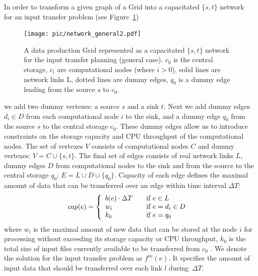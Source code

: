 \documentclass{svjour3}                     %
\begin{document}
In order to transform a given graph of a Grid into a capacitated $\{s,t\}$
network for an input transfer problem (see Figure~\ref{network_general})
%
\begin{figure}[b]
	\begin{center}
		\texttt{[image: pic/network\_general2.pdf]}
	\end{center}
	\caption{A data production Grid represented as a capacitated $\{s,t\}$ network for the input transfer planning (general case). $c_{0}$ is the central storage, $c_{i}$ are computational nodes (where $i>0$), solid lines are network links L, dotted lines are dummy edges, $q_{0}$ is a dummy edge leading from the source $s$ to $c_{0}$. }
	\label{network_general}
\end{figure}  
%
 we add two dummy vertexes: a source $s$
and a sink $t$. Next we add  dummy edges $d_{i} \in D$ from each computational
node $i$ to the sink, and a dummy edge $q_{0}$ from the source $s$ to the
central storage $c_{0}$. These dummy edges allow us to introduce constraints
on the storage capacity and CPU throughput of the computational nodes. The set of vertexes $V$ consists of
computational nodes $C$ and dummy vertexes: $V= C \cup \{s,t\}$. The final set
of edges consists of real network links $L$, dummy edges $D$ from
computational nodes to the sink and from the source to the central storage
$q_{0}$: $E= L \cup D \cup \{q_{0}\}$. Capacity of each edge defines the
maximal amount of data that can be transferred over an edge within time
interval $\Delta T$: 
%
\begin{equation} 
\label{edge_cap} 
cap(e) = \left\{
\begin{array}{l l} 
b(e) \cdot \Delta T & \quad \text{if }e \in L \\
 w_{i} & \quad \text{if } e = d_{i} \in D \\
  k_{0} & \quad \text{if } e = q_{0} 
\end{array} \right.
\end{equation} 
%
where $w_{i}$ is the maximal amount of new data that can be
stored at the node $i$ for processing without exceeding its storage capacity or CPU throughput, $k_{0}$ is the total size of input files currently available to be transferred from $c_{0}$ . We denote the solution for the input transfer problem as $f^{in}(e)$. It specifies the amount of input data that should be transferred over each link $l$ during~$\Delta T$.
\end{document}
